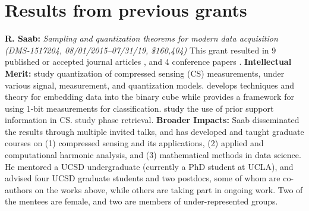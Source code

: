 
\section{Results from previous grants}
{\bf R. Saab:} {\em Sampling and quantization theorems for modern data acquisition (DMS-1517204, 08/01/2015--07/31/19,
\$160,404)}
This grant resulted in 9 published or accepted journal articles \cite{knudson2016one, mansour2017recovery, needell2017weighted, SaabIEEEIT, needell2018simple, LybrandSaab2018, iwen2018phase, huynh2018fast, feng2019quantized}, and 4 conference papers \cite{NSW17_conf, FKS17_conf, IPSV17_conf, ILNS19}.  {\bf Intellectual Merit:}  \cite{knudson2016one, SaabIEEEIT, feng2019quantized, LybrandSaab2018, iwen2019new} study quantization of compressed sensing (CS) measurements, under various signal, measurement, and quantization models. \cite{huynh2018fast} develops techniques and theory for embedding data into the binary cube while  \cite{needell2018simple} provides a framework for using $1$-bit  measurements for classification. \cite{mansour2017recovery, needell2017weighted} study  the use of prior support information  in CS. \cite{iwen2018phase, IPSV17_conf} study phase retrieval. %
{\bf Broader Impacts: }  Saab disseminated the results through multiple invited talks, and has developed and taught graduate courses on (1) compressed sensing and its applications, (2) applied and computational harmonic analysis, and (3) mathematical methods in data science. He mentored a UCSD undergraduate (currently a PhD student at UCLA), and advised four UCSD graduate students and two postdocs,  some of whom are co-authors on the works above, while others are taking part in ongoing work. Two of the  mentees are female, and two are members of under-represented groups.%

